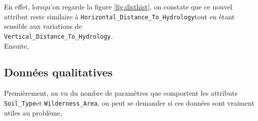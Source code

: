 \documentclass[12pt,a4paper]{article}
\numberwithin{equation}{section}
\newcommand{\hhydro}{\texttt{Horizontal\_Distance\_To\_Hydrology}}
\newcommand{\vhydro}{\texttt{Vertical\_Distance\_To\_Hydrology}}
\newcommand{\wilderness}{\texttt{Wilderness\_Area}}
\newcommand{\soil}{\texttt{Soil\_Type}}
\begin{document}
	En effet, lorsqu'on regarde la figure \ref{fig:disthist}, on constate que ce nouvel attribut reste similaire à \hhydro tout en étant sensible aux variations de\\ \vhydro.\\

	
	Ensuite, 
	
	\newpage

	
	\subsection{Données qualitatives}
	Premièrement, au vu du nombre de paramètres que comportent les attributs \soil et \wilderness, on peut se demander si ces données sont vraiment utiles au problème,
	
	
	
	\begin{figure}[h]
		\centering
	\hfill
	\hfill

	\medskip
	

\end{figure}
\end{document}
